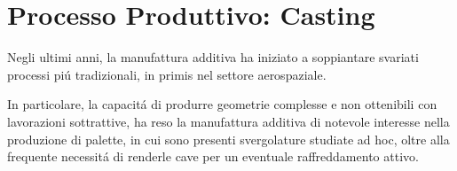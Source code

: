 \documentclass{article}
\begin{document}
      
        \begin{table}[h!]
            \centering
            \caption{Funzione degli elementi alliganti \autocite{Mouritz}}
            \label{tab:funz_alliganti}
            \end{table}
            

    \clearpage


    \section{Processo Produttivo: Casting\label{Casting}}

    Negli ultimi anni, la manufattura additiva ha iniziato a soppiantare svariati 
    processi piú tradizionali, in primis nel settore aerospaziale. 

    In particolare, la capacitá di produrre geometrie complesse e non ottenibili
    con lavorazioni sottrattive, ha reso la manufattura additiva di notevole interesse 
    nella produzione di palette, in cui sono presenti svergolature studiate ad hoc, 
    oltre alla frequente necessitá di renderle cave per un eventuale raffreddamento attivo.
\end{document}
